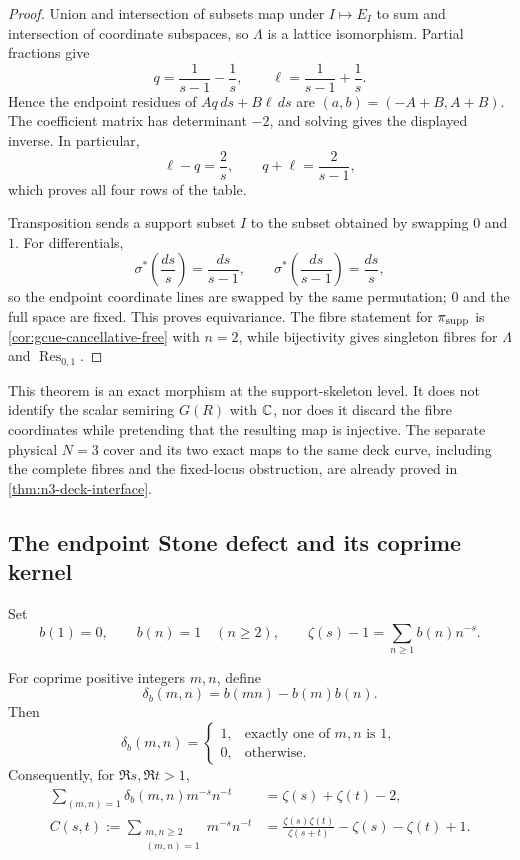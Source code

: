 \begin{proof}
Union and intersection of subsets map under $I\mapsto E_I$ to sum and intersection of
coordinate subspaces, so $\Lambda$ is a lattice isomorphism.  Partial fractions give
\[
 q=\frac1{s-1}-\frac1s,
 \qquad
 \ell=\frac1{s-1}+\frac1s.
\]
Hence the endpoint residues of $Aq\,ds+B\ell\,ds$ are
$(a,b)=(-A+B,A+B)$.  The coefficient matrix has determinant $-2$, and solving gives the
displayed inverse.  In particular,
\[
 \ell-q=\frac2s,
 \qquad
 q+\ell=\frac2{s-1},
\]
which proves all four rows of the table.

Transposition sends a support subset $I$ to the subset obtained by swapping $0$ and $1$.
For differentials,
\[
 \sigma^*\left(\frac{ds}{s}\right)=\frac{ds}{s-1},
 \qquad
 \sigma^*\left(\frac{ds}{s-1}\right)=\frac{ds}{s},
\]
so the endpoint coordinate lines are swapped by the same permutation; $0$ and the full
space are fixed.  This proves equivariance.  The fibre statement for $\pi_{\rm supp}$ is
\cref{cor:gcue-cancellative-free} with $n=2$, while bijectivity gives singleton fibres for
$\Lambda$ and $\operatorname{Res}_{0,1}$.
\end{proof}

This theorem is an exact morphism at the support-skeleton level.  It does not identify the
scalar semiring $G(R)$ with $\mathbb C$, nor does it discard the fibre coordinates while pretending
that the resulting map is injective.  The separate physical $N=3$ cover and its two exact
maps to the same deck curve, including the complete fibres and the fixed-locus obstruction,
are already proved in \cref{thm:n3-deck-interface}.

\subsection{The endpoint Stone defect and its coprime kernel}

Set
\[
 b(1)=0,\qquad b(n)=1\quad(n\ge2),
 \qquad
 \zeta(s)-1=\sum_{n\ge1}b(n)n^{-s}.
\]

\begin{theorem}
\label{thm:gcue-stone-coprime}
For coprime positive integers $m,n$, define
\[
 \delta_b(m,n)=b(mn)-b(m)b(n).
\]
Then
\[
 \delta_b(m,n)=
 \begin{cases}
 1,&\text{exactly one of $m,n$ is $1$},\\
 0,&\text{otherwise}.
 \end{cases}
\]
Consequently, for $\Re s,\Re t>1$,
\begin{align}
 \sum_{(m,n)=1}\delta_b(m,n)m^{-s}n^{-t}
 &=\zeta(s)+\zeta(t)-2,
 \label{eq:gcue-boundary-defect}\\
 C(s,t):=\sum_{\substack{m,n\ge2\\(m,n)=1}}m^{-s}n^{-t}
 &=\frac{\zeta(s)\zeta(t)}{\zeta(s+t)}-\zeta(s)-\zeta(t)+1.
 \label{eq:gcue-coprime-kernel}
\end{align}
\end{theorem}

